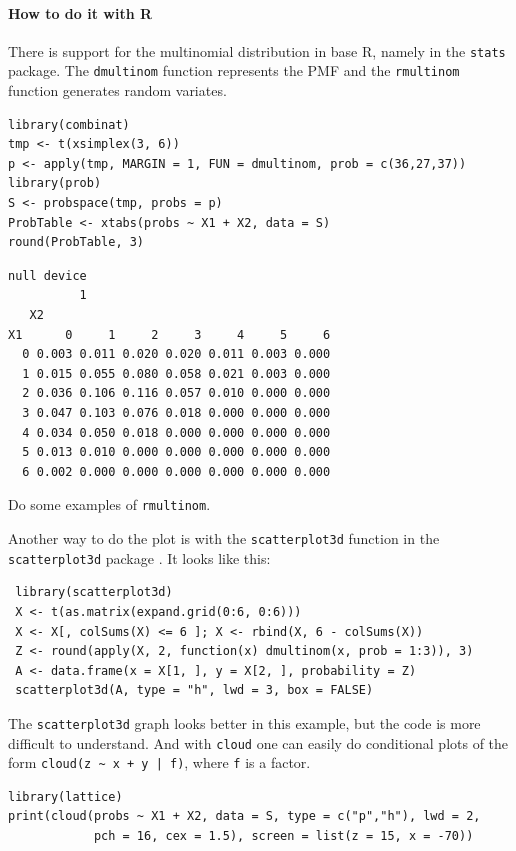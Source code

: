 \documentclass[captions=tableheading]{scrbook}
\begin{document}
\paragraph*{How to do it with \textsf{R}}

There is support for the multinomial distribution in base \textsf{R}, namely in the \texttt{stats} package. The \texttt{dmultinom} function represents the PMF and the \texttt{rmultinom} function generates random variates.




\begin{verbatim}
library(combinat)
tmp <- t(xsimplex(3, 6))
p <- apply(tmp, MARGIN = 1, FUN = dmultinom, prob = c(36,27,37))
library(prob)
S <- probspace(tmp, probs = p)
ProbTable <- xtabs(probs ~ X1 + X2, data = S)
round(ProbTable, 3)
\end{verbatim}


\begin{verbatim}
null device 
          1
   X2
X1      0     1     2     3     4     5     6
  0 0.003 0.011 0.020 0.020 0.011 0.003 0.000
  1 0.015 0.055 0.080 0.058 0.021 0.003 0.000
  2 0.036 0.106 0.116 0.057 0.010 0.000 0.000
  3 0.047 0.103 0.076 0.018 0.000 0.000 0.000
  4 0.034 0.050 0.018 0.000 0.000 0.000 0.000
  5 0.013 0.010 0.000 0.000 0.000 0.000 0.000
  6 0.002 0.000 0.000 0.000 0.000 0.000 0.000
\end{verbatim}

Do some examples of \texttt{rmultinom}.

Another way to do the plot is with the \texttt{scatterplot3d} function in the \texttt{scatterplot3d} package \cite{Liggesscatterplot3d}. It looks like this: 
\begin{verbatim}
 library(scatterplot3d)
 X <- t(as.matrix(expand.grid(0:6, 0:6)))
 X <- X[, colSums(X) <= 6 ]; X <- rbind(X, 6 - colSums(X))
 Z <- round(apply(X, 2, function(x) dmultinom(x, prob = 1:3)), 3)
 A <- data.frame(x = X[1, ], y = X[2, ], probability = Z)
 scatterplot3d(A, type = "h", lwd = 3, box = FALSE)
\end{verbatim}
The \texttt{scatterplot3d} graph looks better in this example, but the code is more difficult to understand. And with \texttt{cloud} one can easily do conditional plots of the form \texttt{cloud(z \textasciitilde{} x + y | f)}, where \texttt{f} is a factor.


\begin{verbatim}
library(lattice)
print(cloud(probs ~ X1 + X2, data = S, type = c("p","h"), lwd = 2, 
            pch = 16, cex = 1.5), screen = list(z = 15, x = -70))
\end{verbatim}
\end{document}
